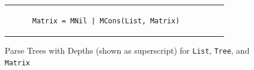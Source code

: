 \begin{figure}[t]
\begin{tabular}{ccc}
\begin{subfigure}[b]{0.4\textwidth}
\begin{center}
\end{center}
\caption{\label{fig:matrixParseTree}{\tt Matrix = MNil | \newline MCons(List, Matrix)}}
\end{subfigure}%
\\
\end{tabular}
\vspace{-12px}
\caption{\label{fig:parseTrees}Parse Trees with Depths (shown as superscript) for {\tt List}, {\tt Tree}, and {\tt Matrix}}
\end{figure}
